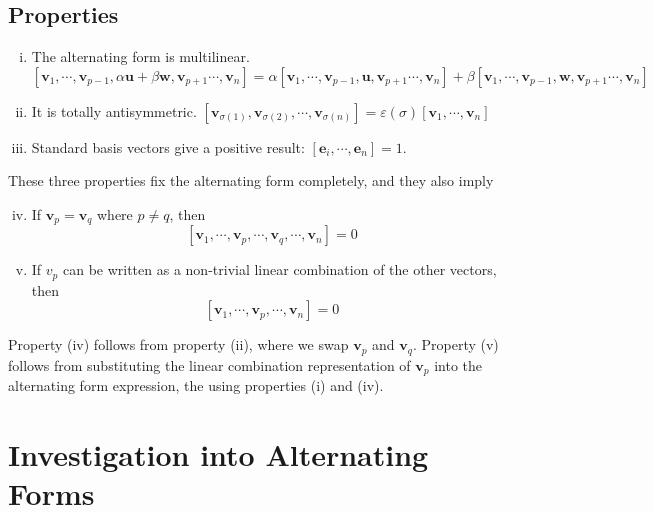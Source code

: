 \documentclass{article}
\begin{document}
\subsection{Properties}
\begin{enumerate}[(i)]
	\item The alternating form is multilinear.
	      \[ [ \bm v_1, \cdots, \bm v_{p-1}, \alpha \bm u + \beta \bm w, \bm v_{p+1} \cdots, \bm v_n ] = \alpha [ \bm v_1, \cdots, \bm v_{p-1}, \bm u, \bm v_{p+1} \cdots, \bm v_n ] + \beta [ \bm v_1, \cdots, \bm v_{p-1}, \bm w, \bm v_{p+1} \cdots, \bm v_n ] \]
	\item It is totally antisymmetric. $[ \bm v_{\sigma(1)}, \bm v_{\sigma(2)}, \cdots, \bm v_{\sigma(n)} ] = \varepsilon(\sigma) [ \bm v_1, \cdots, \bm v_n ]$
	\item Standard basis vectors give a positive result: $[\bm e_i, \cdots, \bm e_n] = 1$.
\end{enumerate}
These three properties fix the alternating form completely, and they also imply
\begin{enumerate}[(i)]
	\setcounter{enumi}{3}
	\item If $\bm v_p = \bm v_q$ where $p \neq q$, then
	      \[ [\bm v_1, \cdots, \bm v_p, \cdots, \bm v_q, \cdots, \bm v_n ] = 0 \]
	\item If $v_p$ can be written as a non-trivial linear combination of the other vectors, then
	      \[ [\bm v_1, \cdots, \bm v_p, \cdots, \bm v_n ] = 0 \]
\end{enumerate}
Property (iv) follows from property (ii), where we swap $\bm v_p$ and $\bm v_q$. Property (v) follows from substituting the linear combination representation of $\bm v_p$ into the alternating form expression, the using properties (i) and (iv).

\section{Investigation into Alternating Forms}
\end{document}
